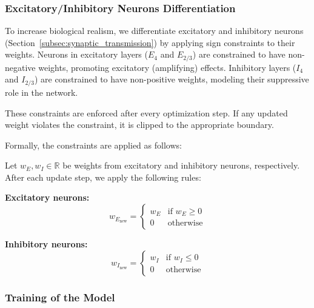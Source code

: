 \subsubsection{Excitatory/Inhibitory Neurons Differentiation}
\label{subsubsec:exc_inh_differentiation}

To increase biological realism, we differentiate excitatory and inhibitory neurons (Section~\ref{subsec:synaptic_transmission}) by applying sign constraints to their weights. Neurons in excitatory layers ($E_4$ and $E_{2/3}$) are constrained to have non-negative weights, promoting excitatory (amplifying) effects. Inhibitory layers ($I_4$ and $I_{2/3}$) are constrained to have non-positive weights, modeling their suppressive role in the network.

These constraints are enforced after every optimization step. If any updated weight violates the constraint, it is clipped to the appropriate boundary.

Formally, the constraints are applied as follows:

\begin{defn}
    Let $w_E, w_I \in \mathbb{R}$ be weights from excitatory and inhibitory neurons, respectively. After each update step, we apply the following rules:
    
    \textbf{Excitatory neurons:}
    \begin{equation*}
        w_{E_{\text{new}}} =
        \begin{cases}
            w_E & \text{if } w_E \geq 0 \\
            0 & \text{otherwise}
        \end{cases}
    \end{equation*}
    
    \textbf{Inhibitory neurons:}
    \begin{equation*}
        w_{I_{\text{new}}} =
        \begin{cases}
            w_I & \text{if } w_I \leq 0 \\
            0 & \text{otherwise}
        \end{cases}
    \end{equation*}
\end{defn}
\label{def:weight_constraints}


\subsubsection{Training of the Model}
\label{subsubsec:training_model}

